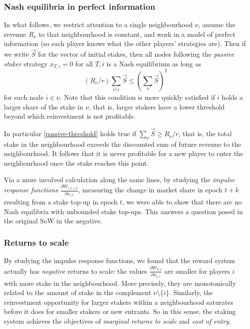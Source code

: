 \subsubsection*{Nash equilibria in perfect information}

In what follows, we restrict attention to a single neighbourhood $\nu$, assume the revenue $R_\nu$ to that neighbourhood is constant, and work in a model of perfect information (so each player knows what the other players' strategies are). Then if we write $\vec{S}$ for the vector of initial stakes, then all nodes following the \emph{passive staker} strategy $x_{T,i}=0$ for all $T, i$ is a Nash equilibrium as long as
%
\begin{equation} \label{passive-threshold}
 (R_\nu/r)\sum_{\nu\setminus i}\vec{S} \leq \left(\sum_{\nu}\vec{S} \right)^2
\end{equation}
%
for each node $i\in \nu$. 
%
Note that this condition is more quickly satisfied if $i$ holds a larger share of the stake in $\nu$, that is, larger stakers have a lower threshold beyond which reinvestment is not profitable.

In particular \eqref{passive-threshold} holds true if $\sum_{\nu}\vec{S}\geq R_\nu/r$, that is, the total stake in the neighbourhood exceeds the discounted sum of future revenue to the neighbourhood.
%
It follows that it is never profitable for a new player to enter the neighbourhood once the stake reaches this point.

Via a more involved calculation along the same lines, by studying the \emph{impulse response functions} $\frac{\partial W_{i,t+k}}{\partial x_{i,t}}$, measuring the change in market share in epoch $t+k$ resulting from a stake top-up in epoch $t$, 
%
we were able to show that there are no Nash equilibria with unbounded stake top-ups. This answers a question posed in the original SoW in the negative.

\subsubsection*{Returns to scale}

By studying the impulse response functions, we found that the reward system actually has \emph{negative} returns to scale: the values $\frac{\partial W_{T,i}}{\partial x_{t,i}}$ are smaller for players $i$ with more stake in the neighbourhood. More precisely, they are monotonically related to the amount of stake in the complement $\nu\setminus\{i\}$.
%
Similarly, the reinvestment opportunity for larger stakers within a neighbourhood saturates before it does for smaller stakers or new entrants.
%
So in this sense, the staking system achieves the objectives of \emph{marginal returns to scale} and \emph{cost of entry}.

